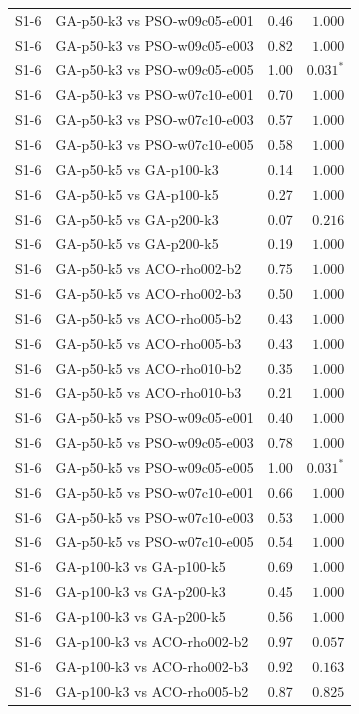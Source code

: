 \begin{tabular}{llrr}
S1-6 & GA-p50-k3 vs PSO-w09c05-e001 & 0.46 & $1.000$ \\
S1-6 & GA-p50-k3 vs PSO-w09c05-e003 & 0.82 & $1.000$ \\
S1-6 & GA-p50-k3 vs PSO-w09c05-e005 & 1.00 & $0.031^{*}$ \\
S1-6 & GA-p50-k3 vs PSO-w07c10-e001 & 0.70 & $1.000$ \\
S1-6 & GA-p50-k3 vs PSO-w07c10-e003 & 0.57 & $1.000$ \\
S1-6 & GA-p50-k3 vs PSO-w07c10-e005 & 0.58 & $1.000$ \\
S1-6 & GA-p50-k5 vs GA-p100-k3 & 0.14 & $1.000$ \\
S1-6 & GA-p50-k5 vs GA-p100-k5 & 0.27 & $1.000$ \\
S1-6 & GA-p50-k5 vs GA-p200-k3 & 0.07 & $0.216$ \\
S1-6 & GA-p50-k5 vs GA-p200-k5 & 0.19 & $1.000$ \\
S1-6 & GA-p50-k5 vs ACO-rho002-b2 & 0.75 & $1.000$ \\
S1-6 & GA-p50-k5 vs ACO-rho002-b3 & 0.50 & $1.000$ \\
S1-6 & GA-p50-k5 vs ACO-rho005-b2 & 0.43 & $1.000$ \\
S1-6 & GA-p50-k5 vs ACO-rho005-b3 & 0.43 & $1.000$ \\
S1-6 & GA-p50-k5 vs ACO-rho010-b2 & 0.35 & $1.000$ \\
S1-6 & GA-p50-k5 vs ACO-rho010-b3 & 0.21 & $1.000$ \\
S1-6 & GA-p50-k5 vs PSO-w09c05-e001 & 0.40 & $1.000$ \\
S1-6 & GA-p50-k5 vs PSO-w09c05-e003 & 0.78 & $1.000$ \\
S1-6 & GA-p50-k5 vs PSO-w09c05-e005 & 1.00 & $0.031^{*}$ \\
S1-6 & GA-p50-k5 vs PSO-w07c10-e001 & 0.66 & $1.000$ \\
S1-6 & GA-p50-k5 vs PSO-w07c10-e003 & 0.53 & $1.000$ \\
S1-6 & GA-p50-k5 vs PSO-w07c10-e005 & 0.54 & $1.000$ \\
S1-6 & GA-p100-k3 vs GA-p100-k5 & 0.69 & $1.000$ \\
S1-6 & GA-p100-k3 vs GA-p200-k3 & 0.45 & $1.000$ \\
S1-6 & GA-p100-k3 vs GA-p200-k5 & 0.56 & $1.000$ \\
S1-6 & GA-p100-k3 vs ACO-rho002-b2 & 0.97 & $0.057$ \\
S1-6 & GA-p100-k3 vs ACO-rho002-b3 & 0.92 & $0.163$ \\
S1-6 & GA-p100-k3 vs ACO-rho005-b2 & 0.87 & $0.825$ \\

\end{tabular}
